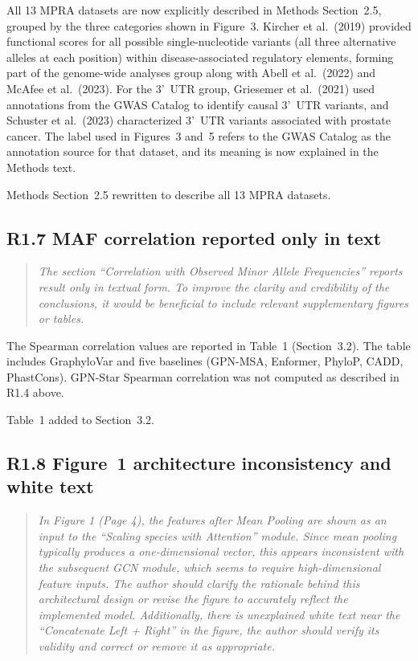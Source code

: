 \documentclass[11pt]{article}
\begin{document}
All 13 MPRA datasets are now explicitly described in Methods Section~2.5,
grouped by the three categories shown in Figure~3.  Kircher et al.\ (2019)
provided functional scores for all possible single-nucleotide variants
(all three alternative alleles at each position) within disease-associated
regulatory elements, forming part of the genome-wide
analyses group along with Abell et al.\ (2022) and McAfee et al.\ (2023).
For the 3'~UTR group, Griesemer et al.\ (2021) used annotations from the
GWAS Catalog to identify causal 3'~UTR variants, and Schuster et al.\
(2023) characterized 3'~UTR variants associated with prostate cancer.
The label used in Figures~3 and~5 refers to the GWAS Catalog as the
annotation source for that dataset, and its meaning is now explained
in the Methods text.

Methods Section~2.5 rewritten to describe all 13 MPRA datasets.

\bigskip

\subsection*{R1.7 MAF correlation reported only in text}

\begin{quote}
\itshape
The section ``Correlation with Observed Minor Allele Frequencies''
reports result only in textual form.  To improve the clarity and
credibility of the conclusions, it would be beneficial to include
relevant supplementary figures or tables.
\end{quote}

The Spearman correlation values are reported in Table~1 (Section~3.2).
The table includes GraphyloVar and five baselines (GPN-MSA, Enformer,
PhyloP, CADD, PhastCons).  GPN-Star Spearman correlation was not computed
as described in R1.4 above.

Table~1 added to Section~3.2.

\bigskip

\subsection*{R1.8 Figure~1 architecture inconsistency and white text}

\begin{quote}
\itshape
In Figure 1 (Page 4), the features after Mean Pooling are shown as an
input to the ``Scaling species with Attention'' module.  Since mean
pooling typically produces a one-dimensional vector, this appears
inconsistent with the subsequent GCN module, which seems to require
high-dimensional feature inputs.  The author should clarify the
rationale behind this architectural design or revise the figure to
accurately reflect the implemented model.  Additionally, there is
unexplained white text near the ``Concatenate Left + Right'' in the
figure, the author should verify its validity and correct or remove it
as appropriate.
\end{quote}
\end{document}

